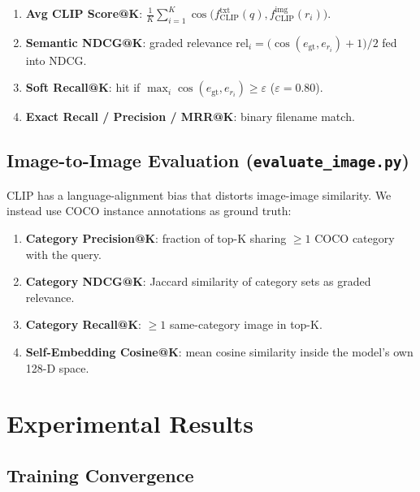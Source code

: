 \documentclass[conference]{IEEEtran}
\begin{document}
\begin{enumerate}
  \item \textbf{Avg CLIP Score@K}:
        $\frac{1}{K}\sum_{i=1}^K\cos\!\bigl(f_{\text{CLIP}}^{\text{txt}}(q),
        f_{\text{CLIP}}^{\text{img}}(r_i)\bigr)$.
  \item \textbf{Semantic NDCG@K}: graded relevance
        $\text{rel}_i = \bigl(\cos(e_{\text{gt}},e_{r_i})+1\bigr)/2$
        fed into NDCG.
  \item \textbf{Soft Recall@K}: hit if
        $\max_i\cos(e_{\text{gt}},e_{r_i})\ge\varepsilon$ ($\varepsilon=0.80$).
  \item \textbf{Exact Recall / Precision / MRR@K}: binary filename match.
\end{enumerate}

\subsection{Image-to-Image Evaluation (\texttt{evaluate\_image.py})}
CLIP has a language-alignment bias that distorts image-image similarity.
We instead use COCO instance annotations as ground truth:

\begin{enumerate}
  \item \textbf{Category Precision@K}:
        fraction of top-K sharing $\ge1$ COCO category with the query.
  \item \textbf{Category NDCG@K}: Jaccard similarity of category sets
        as graded relevance.
  \item \textbf{Category Recall@K}: $\ge1$ same-category image in top-K.
  \item \textbf{Self-Embedding Cosine@K}: mean cosine similarity inside
        the model's own 128-D space.
\end{enumerate}

\section{Experimental Results}

\subsection{Training Convergence}
\end{document}
